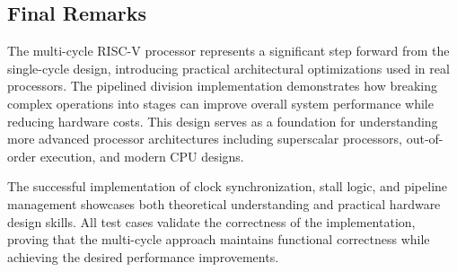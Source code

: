 \documentclass[a4paper, 11pt]{article}
\begin{document}
\subsection{Final Remarks}

The multi-cycle RISC-V processor represents a significant step forward from the single-cycle design, introducing practical architectural optimizations used in real processors. The pipelined division implementation demonstrates how breaking complex operations into stages can improve overall system performance while reducing hardware costs. This design serves as a foundation for understanding more advanced processor architectures including superscalar processors, out-of-order execution, and modern CPU designs.

The successful implementation of clock synchronization, stall logic, and pipeline management showcases both theoretical understanding and practical hardware design skills. All test cases validate the correctness of the implementation, proving that the multi-cycle approach maintains functional correctness while achieving the desired performance improvements.
\end{document}

